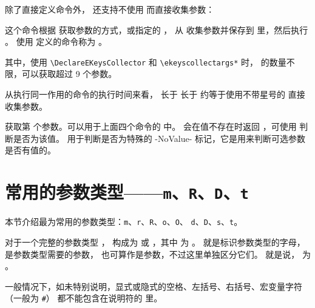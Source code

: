 \documentclass[openany]{book}
\begin{document}
除了直接定义命令外， 还支持不使用  而直接收集参数：
\begin{syntax}
  \V\DeclareEKeysCollector   {} 
  \V\DeclareEKeysCollector *    
  \V\ekeyscollectargs   {}   
  \V\ekeyscollectargs *    
\end{syntax}
这个命令根据  获取参数的方式，或指定的  ，
从  收集参数并保存到  里，然后执行 。
使用  定义的命令称为 。

其中，使用 \verb|\DeclareEKeysCollector| 和 \verb|\ekeyscollectargs*| 时，
 的数量不限，可以获取超过 9 个参数。

从执行同一作用的命令的执行时间来看， 长于  
长于  约等于使用不带星号的  直接收集参数。

\begin{syntax}
\V\ekeyscollectorarg {}
\end{syntax}
获取第  个参数。可以用于上面四个命令的  中。
会在值不存在时返回 ，可使用  判断是否为该值。
 用于判断是否为特殊的 -NoValue- 标记，它是用来判断可选参数是否有值的。

\section{常用的参数类型——\texttt m、\texttt R、\texttt D、\texttt t}\label{sec:fq-used}

本节介绍最为常用的参数类型：\texttt m、\texttt r、\texttt R、\texttt o、\texttt O、
\texttt d、\texttt D、\texttt s、\texttt t。

对于一个完整的参数类型 ，
构成为  或 ，其中  为
。 就是标识参数类型的字母，
 是参数类型需要的参数， 也可算作是参数，不过这里单独区分它们。
就是说， 为 。

一般情况下，如未特别说明，显式或隐式的空格、左括号、右括号、宏变量字符（一般为 \verb|#|）
都不能包含在说明符的  里。
\end{document}
